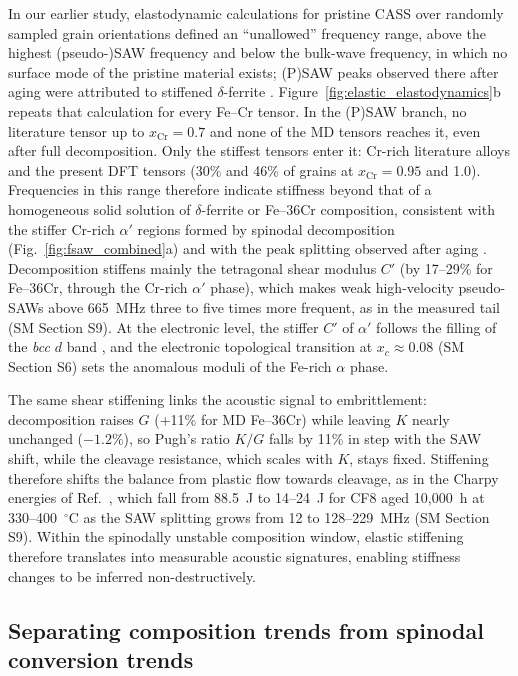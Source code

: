 \documentclass[final,3p,times]{elsarticle}
\begin{document}
In our earlier study, elastodynamic calculations for pristine CASS over randomly sampled grain orientations defined an ``unallowed'' frequency range, above the highest (pseudo-)SAW frequency and below the bulk-wave frequency, in which no surface mode of the pristine material exists; (P)SAW peaks observed there after aging were attributed to stiffened $\delta$-ferrite \cite{al2023detecting}. Figure~\ref{fig:elastic_elastodynamics}b repeats that calculation for every Fe--Cr tensor. In the (P)SAW branch, no literature tensor up to $x_{\mathrm{Cr}}=0.7$ and none of the MD tensors reaches it, even after full decomposition. Only the stiffest tensors enter it: Cr-rich literature alloys and the present DFT tensors (30\% and 46\% of grains at $x_{\mathrm{Cr}}=0.95$ and 1.0). Frequencies in this range therefore indicate stiffness beyond that of a homogeneous solid solution of $\delta$-ferrite or Fe--36Cr composition, consistent with the stiffer Cr-rich $\alpha'$ regions formed by spinodal decomposition (Fig.~\ref{fig:fsaw_combined}a) and with the peak splitting observed after aging \cite{al2023detecting}. Decomposition stiffens mainly the tetragonal shear modulus $C'$ (by 17--29\% for Fe--36Cr, through the Cr-rich $\alpha'$ phase), which makes weak high-velocity pseudo-SAWs above 665~MHz three to five times more frequent, as in the measured tail (SM Section S9). At the electronic level, the stiffer $C'$ of $\alpha'$ follows the filling of the \textit{bcc} $d$ band \cite{soderlind1993theory}, and the electronic topological transition at $x_c\approx0.08$ (SM Section S6) sets the anomalous moduli of the Fe-rich $\alpha$ phase.

The same shear stiffening links the acoustic signal to embrittlement: decomposition raises $G$ (+11\% for MD Fe--36Cr) while leaving $K$ nearly unchanged ($-1.2\%$), so Pugh's ratio $K/G$ falls by 11\% \cite{pugh1954xcii} in step with the SAW shift, while the cleavage resistance, which scales with $K$, stays fixed. Stiffening therefore shifts the balance from plastic flow towards cleavage, as in the Charpy energies of Ref.~\cite{al2023detecting}, which fall from 88.5~J to 14--24~J for CF8 aged 10{,}000~h at 330--400~$^\circ$C as the SAW splitting grows from 12 to 128--229~MHz (SM Section S9). Within the spinodally unstable composition window, elastic stiffening therefore translates into measurable acoustic signatures, enabling stiffness changes to be inferred non-destructively.

\subsection{Separating composition trends from spinodal conversion trends}
\end{document}
